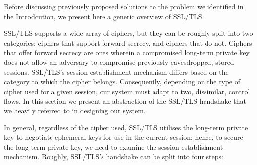 \documentclass[../main.tex]{subfiles}
\begin{document}
\label{sec:ssloverview}
Before discussing previously proposed solutions to the problem we
identified in the Introdcution, we present here a generic overview of
SSL/TLS.

SSL/TLS supports a wide array of ciphers, but they can be roughly
split into two categories: ciphers that support forward secrecy, and
ciphers that do not. Ciphers that offer forward secrecy are ones
wherein a compromised long-term private key does not allow an
adversary to compromise previously eavesdropped, stored
sessions. SSL/TLS's session establishment mechanism differs based
on the category to which the cipher belongs. Consequently,
depending on the type of cipher used for a given session, our system
must adapt to two, dissimilar, control flows. In this section we present
an abstraction of the SSL/TLS handshake that we heavily referred
to in designing our system.

In general, regardless of the cipher used, SSL/TLS utilises
the long-term private key to negotiate ephemeral keys for use in the
current session; hence, to secure the long-term private key, we need
to examine the session establishment mechanism. Roughly, SSL/TLS's
handshake can be split into four steps:
\end{document}
